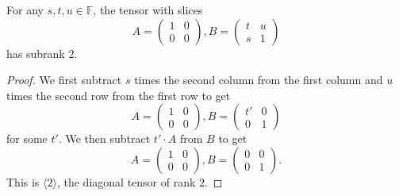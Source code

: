 \documentclass{daj}
\newcommand{\FF}{\mathbb{F}}
\begin{document}
%
\begin{lemma}\label{cl:1000andtus1Sub2} 
For any $s,t,u \in \FF$, the tensor with slices 
\[
A=\begin{pmatrix}1 & 0\\ 0 & 0\end{pmatrix}, B=\begin{pmatrix}t & u\\s & 1\end{pmatrix}
\]
has subrank $2$.
\end{lemma}
\begin{proof} We first subtract $s$ times the second column from the first column and $u$ times the second row from the first row to get 
\[
A=\begin{pmatrix}1 & 0\\ 0 & 0\end{pmatrix}, B=\begin{pmatrix}t' & 0\\ 0 & 1\end{pmatrix}
\]
for some $t'$.
We then subtract $t'\cdot A$ from $B$ to get 
\[
A=\begin{pmatrix}1 & 0\\ 0 & 0\end{pmatrix}, B=\begin{pmatrix}0 & 0\\ 0 & 1\end{pmatrix}.
\]
%
This is $\langle2\rangle$, the diagonal tensor of rank $2$.
\end{proof}
\end{document}
